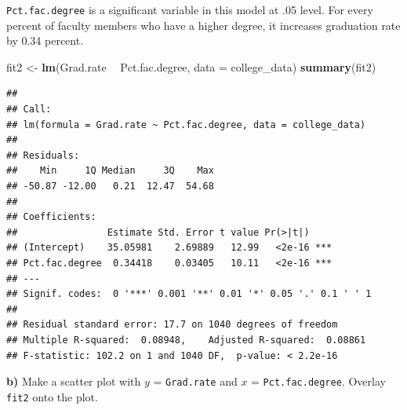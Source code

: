\documentclass[]{article}
\newenvironment{Shaded}{\begin{snugshade}}{\end{snugshade}}
\newcommand{\KeywordTok}[1]{\textcolor[rgb]{0.13,0.29,0.53}{\textbf{#1}}}
\newcommand{\DataTypeTok}[1]{\textcolor[rgb]{0.13,0.29,0.53}{#1}}
\newcommand{\FloatTok}[1]{\textcolor[rgb]{0.00,0.00,0.81}{#1}}
\newcommand{\StringTok}[1]{\textcolor[rgb]{0.31,0.60,0.02}{#1}}
\newcommand{\OperatorTok}[1]{\textcolor[rgb]{0.81,0.36,0.00}{\textbf{#1}}}
\newcommand{\NormalTok}[1]{#1}
\begin{document}
\texttt{Pct.fac.degree} is a significant variable in this model at .05
level. For every percent of faculty members who have a higher degree, it
increases graduation rate by 0.34 percent.

\begin{Shaded}
\begin{Highlighting}[]
\NormalTok{fit2 <-}\StringTok{ }\KeywordTok{lm}\NormalTok{(Grad.rate }\OperatorTok{~}\StringTok{ }\NormalTok{Pct.fac.degree, }\DataTypeTok{data =}\NormalTok{ college_data)}
\KeywordTok{summary}\NormalTok{(fit2)}
\end{Highlighting}
\end{Shaded}

\begin{verbatim}
## 
## Call:
## lm(formula = Grad.rate ~ Pct.fac.degree, data = college_data)
## 
## Residuals:
##    Min     1Q Median     3Q    Max 
## -50.87 -12.00   0.21  12.47  54.68 
## 
## Coefficients:
##                Estimate Std. Error t value Pr(>|t|)    
## (Intercept)    35.05981    2.69889   12.99   <2e-16 ***
## Pct.fac.degree  0.34418    0.03405   10.11   <2e-16 ***
## ---
## Signif. codes:  0 '***' 0.001 '**' 0.01 '*' 0.05 '.' 0.1 ' ' 1
## 
## Residual standard error: 17.7 on 1040 degrees of freedom
## Multiple R-squared:  0.08948,    Adjusted R-squared:  0.08861 
## F-statistic: 102.2 on 1 and 1040 DF,  p-value: < 2.2e-16
\end{verbatim}

\textbf{b)} Make a scatter plot with \(y\) = \texttt{Grad.rate} and
\(x\) = \texttt{Pct.fac.degree}. Overlay \texttt{fit2} onto the plot.

\begin{Shaded}
\end{Shaded}
\end{document}
